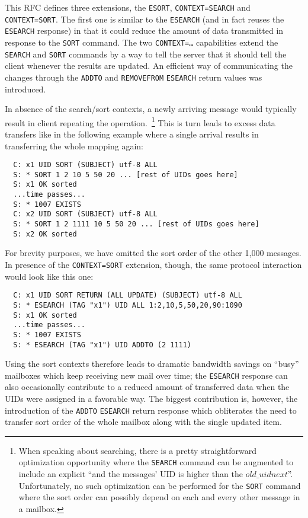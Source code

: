 \documentclass[trojita]{subfiles}
\begin{document}
This RFC defines three extensions, the {\tt ESORT}, {\tt CONTEXT=SEARCH} and {\tt CONTEXT=SORT}.  The first one is
similar to the {\tt ESEARCH} (and in fact reuses the {\tt ESEARCH} response) in that it could reduce the amount of data
transmitted in response to the {\tt SORT} command.  The two {\tt CONTEXT=\ldots} capabilities extend the {\tt SEARCH}
and {\tt SORT} commands by a way to tell the server that it should tell the client whenever the results are updated.  An
efficient way of communicating the changes through the {\tt ADDTO} and {\tt REMOVEFROM} {\tt ESEARCH} return values was
introduced.

In absence of the search/sort contexts, a newly arriving message would typically result in client repeating the
operation.~\footnote{When speaking about searching, there is a pretty straightforward optimization opportunity where the
{\tt SEARCH} command can be augmented to include an explicit ``and the messages' UID is higher than the
$old\_uidnext$''.  Unfortunately, no such optimization can be performed for the {\tt SORT} command where the sort order
can possibly depend on each and every other message in a mailbox.}  This is turn leads to excess data transfers like in
the following example where a single arrival results in transferring the whole mapping again:

\begin{verbatim}
  C: x1 UID SORT (SUBJECT) utf-8 ALL
  S: * SORT 1 2 10 5 50 20 ... [rest of UIDs goes here]
  S: x1 OK sorted
  ...time passes...
  S: * 1007 EXISTS
  C: x2 UID SORT (SUBJECT) utf-8 ALL
  S: * SORT 1 2 1111 10 5 50 20 ... [rest of UIDs goes here]
  S: x2 OK sorted
\end{verbatim}

For brevity purposes, we have omitted the sort order of the other 1,000 messages.  In presence of the {\tt CONTEXT=SORT}
extension, though, the same protocol interaction would look like this one:

\begin{verbatim}
  C: x1 UID SORT RETURN (ALL UPDATE) (SUBJECT) utf-8 ALL
  S: * ESEARCH (TAG "x1") UID ALL 1:2,10,5,50,20,90:1090
  S: x1 OK sorted
  ...time passes...
  S: * 1007 EXISTS
  S: * ESEARCH (TAG "x1") UID ADDTO (2 1111)
\end{verbatim}

Using the sort contexts therefore leads to dramatic bandwidth savings on ``busy'' mailboxes which keep receiving new
mail over time; the {\tt ESEARCH} response can also occasionally contribute to a reduced amount of transferred data when
the UIDs were assigned in a favorable way.  The biggest contribution is, however, the introduction of the {\tt ADDTO}
{\tt ESEARCH} return response which obliterates the need to transfer sort order of the whole mailbox along with the
single updated item.
\end{document}
